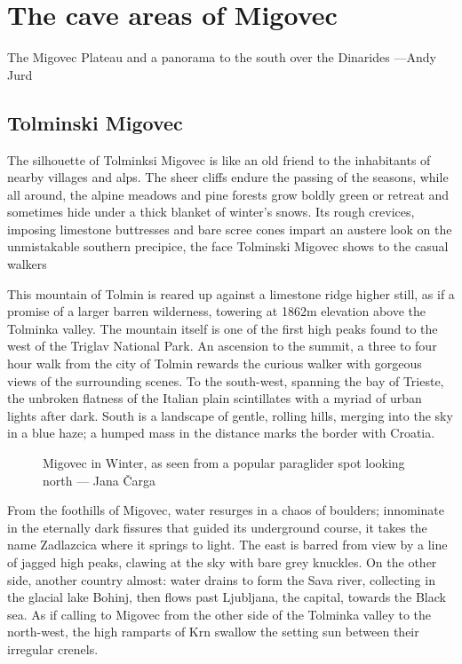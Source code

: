 \section{The cave areas of Migovec}
\begin{marginfigure}
\checkoddpage \ifoddpage \forcerectofloat \else \forceversofloat \fi
\centering
 \caption{The Migovec Plateau and a panorama to the south over the Dinarides ---Andy Jurd}
 \label{near sump}
\end{marginfigure}

\subsection{Tolminski Migovec}
The silhouette of Tolminksi Migovec is like an old friend to the inhabitants of nearby villages and alps. The sheer cliffs endure the passing of the seasons, while all around, the alpine meadows and pine forests grow boldly green or retreat and sometimes hide under a thick blanket of winter's snows. Its rough crevices, imposing limestone buttresses and bare scree cones impart an austere look on the unmistakable southern precipice, the face Tolminski Migovec shows to the casual walkers

This mountain of Tolmin is reared up against a limestone ridge higher still, as if a promise of a larger barren wilderness, towering at 1862m elevation above the Tolminka valley. The mountain itself is one of the first high peaks found to the west of the Triglav National Park. An ascension to the summit, a three to four hour walk from the city of Tolmin rewards the curious walker with gorgeous views of the surrounding scenes. To the south-west, spanning the bay of Trieste, the unbroken flatness of the Italian plain scintillates with a myriad of urban lights after dark. South is a landscape of gentle, rolling hills, merging into the sky in a blue haze; a humped mass in the distance marks the border with Croatia. 

 \begin{figure*}[b!]
 \checkoddpage \ifoddpage \forcerectofloat \else \forceversofloat \fi
\centering
  \label{winter panorama migovec}
  \caption{Migovec in Winter, as seen from a popular paraglider spot looking north --- Jana Čarga}
 \end{figure*}

From the foothills of Migovec, water resurges in a chaos of boulders; innominate in the eternally dark fissures that guided its underground course, it takes the name Zadlazcica where it springs to light.  The east is barred from view by a line of jagged high peaks, clawing at the sky with bare grey knuckles. On the other side, another country almost: water drains to form the Sava river, collecting in the glacial lake Bohinj, then flows past Ljubljana, the capital, towards the Black sea. As if calling to Migovec from the other side of the Tolminka valley to the north-west, the high ramparts of Krn swallow the setting sun between their irregular crenels.


